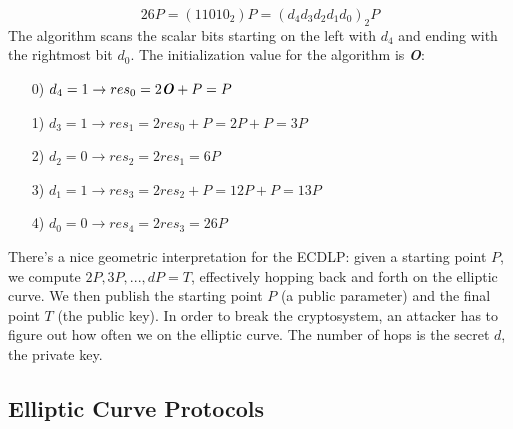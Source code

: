 $$26P=(11010_2)P=(d_4d_3d_2d_1d_0)_2P$$
The algorithm scans the scalar bits starting on the left with $d_4$ and ending with the rightmost bit $d_0$. The initialization value for the algorithm is \textbf{\textit{O}}:
\begin{enumerate}
    \item[0)] $d_4=1\rightarrow res_0=2\text{\textbf{\textit{O}}}+P=P$
    \item[1)] $d_3=1\rightarrow res_1=2res_0+P=2P+P=3P$
    \item[2)] $d_2=0\rightarrow res_2=2res_1=6P$
    \item[3)] $d_1=1\rightarrow res_3=2res_2+P=12P+P=13P$
    \item[4)] $d_0=0\rightarrow res_4=2res_3=26P$
\end{enumerate}
There's a nice geometric interpretation for the ECDLP: given a starting point $P$, we compute $2P,3P,...,dP=T$, effectively hopping back and forth on the elliptic curve. We then publish the starting point $P$ (a public parameter) and the final point $T$ (the public key). In order to break the cryptosystem, an attacker has to figure out how often we  on the elliptic curve. The number of hops is the secret $d$, the private key.

\newpage
\subsection{Elliptic Curve Protocols}
